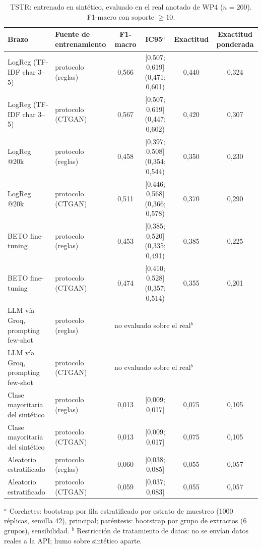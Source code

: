 
\begin{table}[ht]\centering\small
\caption{TSTR: entrenado en sintético, evaluado en el real anotado de WP4 ($n=200$). F1-macro con soporte $\geq 10$.}
\label{tab:tstr}
\begin{tabular}{llcccc}
\toprule
Brazo & Fuente de entrenamiento & F1-macro & IC95$^{a}$ & Exactitud & Exactitud ponderada \\
\midrule
LogReg (TF-IDF char 3--5) & protocolo (reglas) & 0{,}566 & [0{,}507; 0{,}619] (0{,}471; 0{,}601) & 0{,}440 & 0{,}324 \\
LogReg (TF-IDF char 3--5) & protocolo (CTGAN) & 0{,}567 & [0{,}507; 0{,}619] (0{,}447; 0{,}602) & 0{,}420 & 0{,}307 \\
\addlinespace
LogReg @20k & protocolo (reglas) & 0{,}458 & [0{,}397; 0{,}508] (0{,}354; 0{,}544) & 0{,}350 & 0{,}230 \\
LogReg @20k & protocolo (CTGAN) & 0{,}511 & [0{,}446; 0{,}568] (0{,}366; 0{,}578) & 0{,}370 & 0{,}290 \\
\addlinespace
BETO fine-tuning & protocolo (reglas) & 0{,}453 & [0{,}385; 0{,}520] (0{,}335; 0{,}491) & 0{,}385 & 0{,}225 \\
BETO fine-tuning & protocolo (CTGAN) & 0{,}474 & [0{,}410; 0{,}528] (0{,}357; 0{,}514) & 0{,}355 & 0{,}201 \\
\addlinespace
LLM vía Groq, prompting few-shot & protocolo (reglas) & \multicolumn{4}{l}{no evaluado sobre el real$^{b}$} \\
LLM vía Groq, prompting few-shot & protocolo (CTGAN) & \multicolumn{4}{l}{no evaluado sobre el real$^{b}$} \\
\addlinespace
Clase mayoritaria del sintético & protocolo (reglas) & 0{,}013 & [0{,}009; 0{,}017] & 0{,}075 & 0{,}105 \\
Clase mayoritaria del sintético & protocolo (CTGAN) & 0{,}013 & [0{,}009; 0{,}017] & 0{,}075 & 0{,}105 \\
Aleatorio estratificado & protocolo (reglas) & 0{,}060 & [0{,}038; 0{,}085] & 0{,}055 & 0{,}057 \\
Aleatorio estratificado & protocolo (CTGAN) & 0{,}059 & [0{,}037; 0{,}083] & 0{,}055 & 0{,}057 \\
\bottomrule
\end{tabular}
\par\footnotesize $^{a}$ Corchetes: bootstrap por fila estratificado por estrato de muestreo (1000 réplicas, semilla 42), principal; paréntesis: bootstrap por grupo de extractos (6 grupos), sensibilidad. $^{b}$ Restricción de tratamiento de datos: no se envían datos reales a la API; humo sobre sintético aparte.
\end{table}

